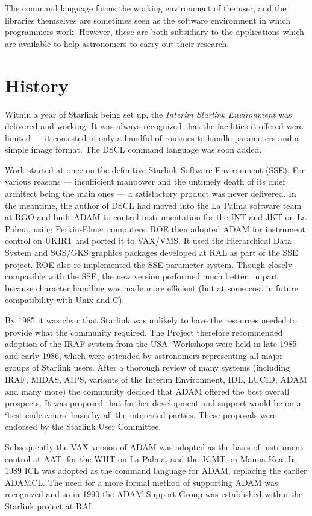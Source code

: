 The command language forms the working environment of the user, and the
libraries themselves are sometimes seen as the software environment in which
programmers work.
However, these are both subsidiary to the applications which are available to
help astronomers to carry out their research.

\section*{History}
\label{S_histadam}

Within a year of Starlink being set up, the {\em Interim Starlink Environment}
was delivered and working.
It was always recognized that the facilities it offered were limited --- it
consisted of only a handful of routines to handle parameters and a simple
image format.
The DSCL command language was soon added. 

Work started at once on the definitive Starlink Software Environment (SSE).
For various reasons --- insufficient manpower and the untimely death of its
chief architect being the main ones --- a satisfactory product was never
delivered.
In the meantime, the author of DSCL had moved into the La Palma software team
at RGO and built ADAM to control instrumentation for the INT and JKT on
La Palma, using Perkin-Elmer computers.
ROE then adopted ADAM for instrument control on UKIRT and ported it to VAX/VMS.
It used the Hierarchical Data System and SGS/GKS graphics packages developed
at RAL as part of the SSE project.
ROE also re-implemented the SSE parameter system.
Though closely compatible with the SSE, the new version performed much better,
in part because character handling was made more efficient (but at some cost in
future compatibility with Unix and C).

By 1985 it was clear that Starlink was unlikely to have the resources needed
to provide what the community required.
The Project therefore recommended adoption of the IRAF system from the USA.
Workshops were held in late 1985 and early 1986, which were attended by
astronomers representing all major groups of Starlink users.
After a thorough review of many systems (including IRAF, MIDAS, AIPS, variants
of the Interim Environment, IDL, LUCID, ADAM and many more) the community
decided that ADAM offered the best overall prospects.
It was proposed that further development and support would be on a `best
endeavours' basis by all the interested parties.
These proposals were endorsed by the Starlink User Committee. 

Subsequently the VAX version of ADAM was adopted as the basis of instrument
control at AAT, for the WHT on La Palma, and the JCMT on Mauna Kea.
In 1989 ICL was adopted as the command language for ADAM, replacing the
earlier ADAMCL.
The need for a more formal method of supporting ADAM was recognized and so in
1990 the ADAM Support Group was established within the Starlink project at RAL.


